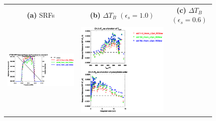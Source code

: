 \begin{figure}[H]
  \centering
  \begin{tabular}{c c c}
    \textsf{\textbf{(a)} SRFs} &
    \textsf{\textbf{(b)} $\Delta T_B$ $(\epsilon_s = 1.0)$} &
    \textsf{\textbf{(c)} $\Delta T_B$ $(\epsilon_s = 0.6)$} \\
    \includegraphics[bb=80 400 280 558,clip,scale=0.85]{graphics/srf/Tset/atms_npp.ch2.osrf.eps} &
    \includegraphics[bb=85 400 260 558,clip,scale=0.85]{graphics/dtb/Tset/e1.0_r0.0/atms_npp.ch2.dTb.eps} & 

\end{tabular}
\end{figure}

